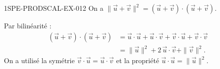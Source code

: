\begin{corrige}{1SPE-PRODSCAL-EX-012}
On a $\|\vec{u} + \vec{v}\|^2 = (\vec{u} + \vec{v}) \cdot (\vec{u} + \vec{v})$.

Par bilinéarité :
\begin{align*}
(\vec{u} + \vec{v}) \cdot (\vec{u} + \vec{v}) &= \vec{u} \cdot \vec{u} + \vec{u} \cdot \vec{v} + \vec{v} \cdot \vec{u} + \vec{v} \cdot \vec{v} \\
&= \|\vec{u}\|^2 + 2\,\vec{u} \cdot \vec{v} + \|\vec{v}\|^2.
\end{align*}
On a utilisé la symétrie $\vec{v} \cdot \vec{u} = \vec{u} \cdot \vec{v}$ et la propriété $\vec{u} \cdot \vec{u} = \|\vec{u}\|^2$.
\end{corrige}
